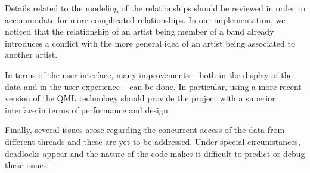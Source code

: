 \documentclass{sig-alternate}
\begin{document}
Details related to the modeling of the relationships should be reviewed in
order to accommodate for more complicated relationships. In our
implementation, we noticed that the relationship of an artist being member of
a band already introduces a conflict with the more general idea of an artist
being associated to another artist.

In terms of the user interface, many improvements – both in the display of the
data and in the user experience – can be done. In particular, using a more
recent version of the QML technology should provide the project with a
superior interface in terms of performance and design.

Finally, several issues arose regarding the concurrent access of the data from
different threads and these are yet to be addressed. Under special
circumstances, deadlocks appear and the nature of the code makes it difficult to
predict or debug these issues.



\balance
\end{document}

